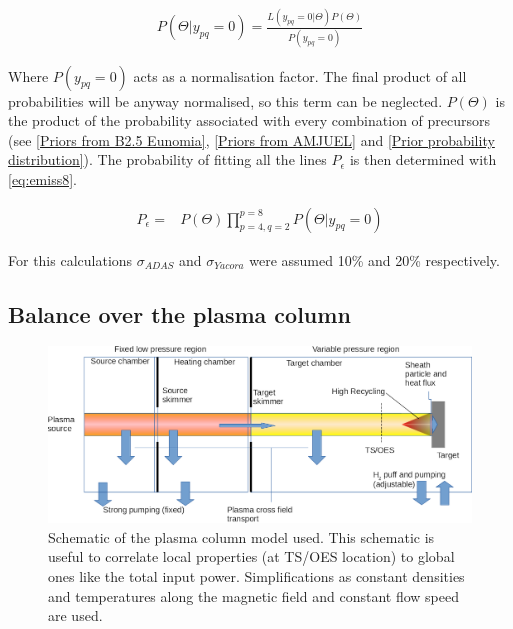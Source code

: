 \begin{equation}
\label{eq:emiss8b}
\begin{aligned}
P(\Theta|y_{pq} = 0) = \frac{L(y_{pq} = 0|\Theta) P(\Theta)}{P(y_{pq} = 0)}
\end{aligned}
\end{equation}

Where $P(y_{pq} = 0)$ acts as a normalisation factor. The final product of all probabilities will be anyway normalised, so this term can be neglected. $P(\Theta)$ is  the product of the probability associated with every combination of precursors (see \autoref{Priors from B2.5 Eunomia}, \ref{Priors from AMJUEL} and \ref{Prior probability distribution}). The probability of fitting all the lines $P_{\epsilon}$ is then determined with \autoref{eq:emiss8}.

\begin{equation}
\label{eq:emiss8}
\begin{aligned}
P_{\epsilon} =& P(\Theta) \prod_{p=4,q=2}^{p=8} P(\Theta|y_{pq} = 0)
\end{aligned}
\end{equation}

For this calculations $\sigma_{ADAS}$ and $\sigma_{Yacora}$ were assumed 10\% and 20\% respectively.

\subsection{Balance over the plasma column}\label{Balance over the plasma column}

\begin{figure}
	\centering
	\includegraphics[width=\linewidth,trim={0 0 0 0},clip]{Chapters/chapter3/figs/plasma_column.png}
	\caption{Schematic of the plasma column model used. This schematic is useful to correlate local properties (at TS/OES location) to global ones like the total input power. Simplifications as constant densities and temperatures along the magnetic field and constant flow speed are used.}
	\label{fig:plasma_column1}
\end{figure}

